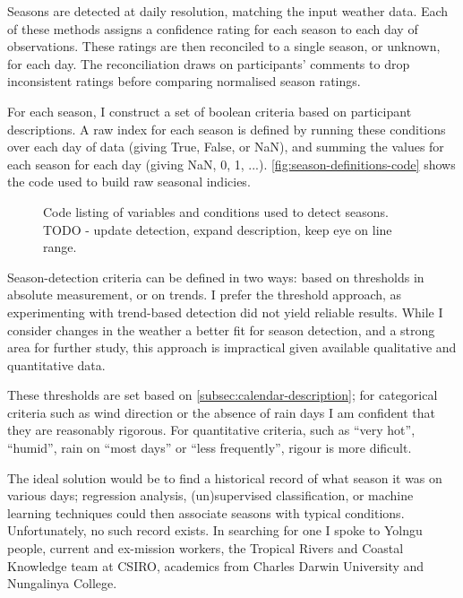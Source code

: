 Seasons are detected at daily resolution, matching the input
weather data.
Each of these methods assigns a confidence rating for each season to each day of
observations.  These ratings are then reconciled to a single season, or unknown,
for each day.  The reconciliation draws on participants' comments to drop inconsistent
ratings before comparing normalised season ratings.

For each season, I construct a set of boolean criteria based on participant
descriptions.  A raw index for each season is defined by
running these conditions over each day of data (giving True, False, or NaN),
and summing the values for each season for each day (giving NaN, 0, 1, ...).
\autoref{fig:season-definitions-code} shows the code used to build raw
seasonal indicies.

\begin{figure}[h]
    
    \centering
    \caption[Python code: definition of season indicies]{
        Code listing of variables and conditions used to detect seasons.
        TODO - update detection, expand description, keep eye on line range.
        }
    \label{fig:season-definitions-code}
\end{figure}

Season-detection criteria can be defined in two ways: based on thresholds
in absolute measurement, or on trends.  I prefer the threshold approach,
as experimenting with trend-based detection did not yield reliable results.
While I consider changes in the weather a better fit for season detection,
and a strong area for further study, this approach is impractical given available
qualitative and quantitative data.

These thresholds are set based on \autoref{subsec:calendar-description};
for categorical criteria such as wind direction or the absence of rain days
I am confident that they are reasonably rigorous.  For quantitative criteria,
such as ``very hot'', ``humid'', rain on ``most days'' or ``less frequently'',
rigour is more dificult.

The ideal solution would be to find a historical record of what season
it was on various days; regression analysis, (un)supervised classification,
or machine learning techniques could then associate seasons with typical
conditions.  Unfortunately, no such record exists.  In searching for one
I spoke to Yolngu people, current and ex-mission workers, the Tropical
Rivers and Coastal Knowledge team at CSIRO, academics from Charles Darwin
University and Nungalinya College.


